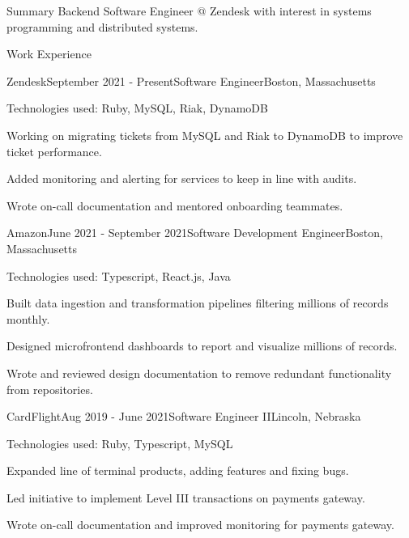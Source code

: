 \documentclass{resume} %
\begin{document}

\begin{rSection}{Summary}
Backend Software Engineer @ Zendesk with interest in systems programming and
distributed systems.
\end{rSection}


\begin{rSection}{Work Experience}

\begin{rSubsection}{Zendesk}{September 2021 - Present}{Software Engineer}{Boston, Massachusetts}
\item Technologies used: Ruby, MySQL, Riak, DynamoDB
\item Working on migrating tickets from MySQL and Riak to DynamoDB to improve ticket
  performance.
\item Added monitoring and alerting for services to keep in line with audits.
\item Wrote on-call documentation and mentored onboarding teammates.
\end{rSubsection}

\begin{rSubsection}{Amazon}{June 2021 - September 2021}{Software Development Engineer}{Boston, Massachusetts}
\item Technologies used: Typescript, React.js, Java
\item Built data ingestion and transformation pipelines filtering millions of
  records monthly.
\item Designed microfrontend dashboards to report and visualize millions of records.
\item Wrote and reviewed design documentation to remove redundant functionality from repositories.
\end{rSubsection}

\begin{rSubsection}{CardFlight}{Aug 2019 - June 2021}{Software Engineer II}{Lincoln, Nebraska}
\item Technologies used: Ruby, Typescript, MySQL
\item Expanded line of terminal products, adding features and fixing bugs.
\item Led initiative to implement Level III transactions on payments gateway.
\item Wrote on-call documentation and improved monitoring for payments gateway.
\end{rSubsection}


\end{rSection}
\end{document}
